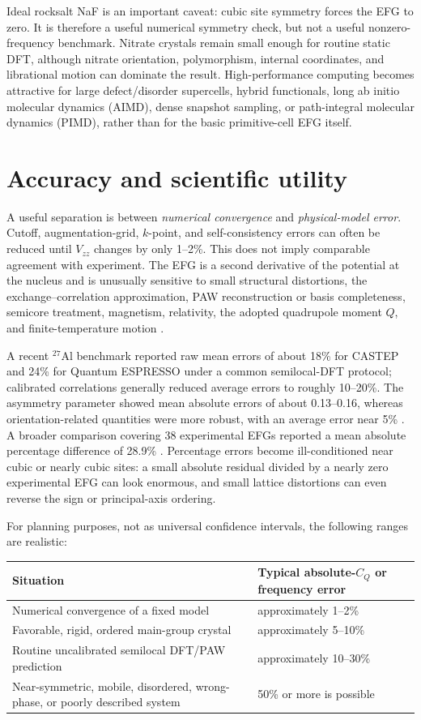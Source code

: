 \documentclass[10pt]{article}
\begin{document}
Ideal rocksalt NaF is an important caveat: cubic site symmetry forces the EFG to zero.  It is therefore a useful numerical symmetry check, but not a useful nonzero-frequency benchmark.  Nitrate crystals remain small enough for routine static DFT, although nitrate orientation, polymorphism, internal coordinates, and librational motion can dominate the result.  High-performance computing becomes attractive for large defect/disorder supercells, hybrid functionals, long ab initio molecular dynamics (AIMD), dense snapshot sampling, or path-integral molecular dynamics (PIMD), rather than for the basic primitive-cell EFG itself.

\section{Accuracy and scientific utility}

A useful separation is between \emph{numerical convergence} and \emph{physical-model error}.  Cutoff, augmentation-grid, $k$-point, and self-consistency errors can often be reduced until $V_{zz}$ changes by only 1--2\%.  This does not imply comparable agreement with experiment.  The EFG is a second derivative of the potential at the nucleus and is unusually sensitive to small structural distortions, the exchange--correlation approximation, PAW reconstruction or basis completeness, semicore treatment, magnetism, relativity, the adopted quadrupole moment $Q$, and finite-temperature motion \cite{petrilli,bonhomme}.

A recent $^{27}$Al benchmark reported raw mean errors of about 18\% for CASTEP and 24\% for Quantum ESPRESSO under a common semilocal-DFT protocol; calibrated correlations generally reduced average errors to roughly 10--20\%.  The asymmetry parameter showed mean absolute errors of about 0.13--0.16, whereas orientation-related quantities were more robust, with an average error near 5\% \cite{reina}.  A broader comparison covering 38 experimental EFGs reported a mean absolute percentage difference of 28.9\% \cite{choudhary}.  Percentage errors become ill-conditioned near cubic or nearly cubic sites: a small absolute residual divided by a nearly zero experimental EFG can look enormous, and small lattice distortions can even reverse the sign or principal-axis ordering.

For planning purposes, not as universal confidence intervals, the following ranges are realistic:
\begin{center}
\small
\begin{tabular}{@{}ll@{}}
\toprule
\textbf{Situation} & \textbf{Typical absolute-$C_Q$ or frequency error} \\
\midrule
Numerical convergence of a fixed model & approximately 1--2\% \\
Favorable, rigid, ordered main-group crystal & approximately 5--10\% \\
Routine uncalibrated semilocal DFT/PAW prediction & approximately 10--30\% \\
Near-symmetric, mobile, disordered, wrong-phase, or poorly described system & 50\% or more is possible \\
\bottomrule
\end{tabular}
\end{center}
\end{document}
